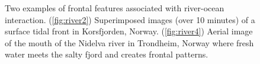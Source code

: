 \documentclass[aoas]{imsart}
\begin{document}
\begin{figure}[!h]
\centering
 \caption{Two examples of frontal features associated with
   river-ocean interaction. %
   (\ref{fig:river2})  Superimposed images (over 10 minutes) of a surface tidal front in
   Korsfjorden, Norway. %
   (\ref{fig:river4}) Aerial image of the mouth of the Nidelva river in
   Trondheim, Norway where fresh water meets the salty fjord and creates
   frontal patterns.} %
 \label{fig:river_fronts}
\end{figure}
\end{document}
